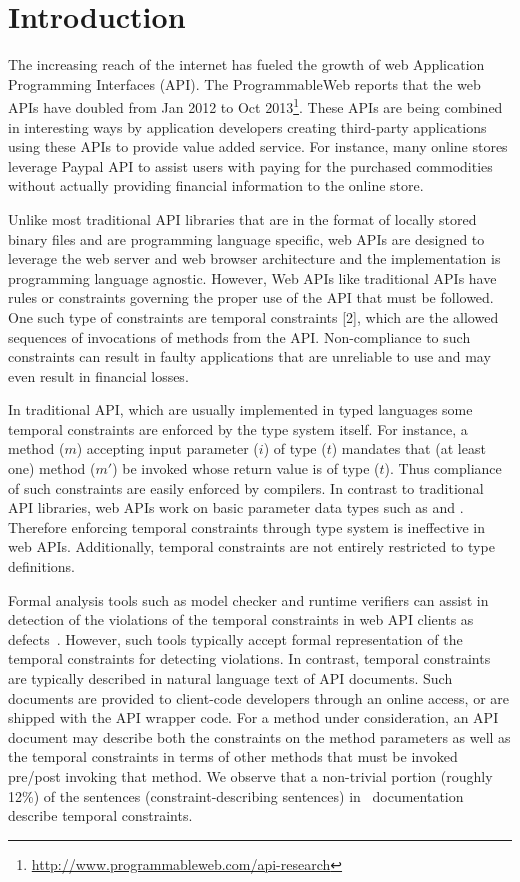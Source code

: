 \section{Introduction}
\label{sec:introduction}

The increasing reach of the internet has fueled the growth of web Application Programming Interfaces (API).
The ProgrammableWeb reports that the web APIs have doubled from Jan 2012 to Oct 2013\footnote{\url{http://www.programmableweb.com/api-research}}.
These APIs are being combined in interesting ways by application developers creating third-party applications using
these APIs to provide value added service.
For instance, many online stores leverage Paypal API to assist users with paying for the purchased commodities without actually
providing financial information to the online store.

Unlike most traditional API libraries that are in the format of locally stored binary files and are programming language specific,
web APIs are designed to leverage the web server and web browser architecture and the implementation is programming language agnostic.
However, Web APIs like traditional APIs have rules or constraints governing the proper  use of the API that must be followed.
One such type of constraints are temporal constraints [2], which are the allowed sequences of invocations of methods from the API.
Non-compliance to such constraints can result in faulty applications that are unreliable to use and may even result in financial losses.

In traditional API, which are usually implemented in typed languages some temporal constraints are enforced by the type system itself.
For instance, a method ($m$) accepting input parameter ($i$) of type ($t$) mandates
that (at least one) method ($m'$) be invoked whose return value is of type ($t$).
Thus compliance of such constraints are easily enforced by compilers.
In contrast to traditional API libraries, web APIs work on basic parameter data types such as  and .
Therefore enforcing temporal constraints through type system is ineffective in web APIs.
Additionally, temporal constraints are not entirely restricted to type definitions.

Formal analysis tools such as model checker and runtime verifiers can assist in detection of the violations of the temporal constraints in web API clients as defects~\cite{lee2012towards}.
However, such tools typically accept formal representation of the temporal constraints for detecting violations.
In contrast, temporal constraints are typically described in natural language text of API documents.
Such documents are provided to client-code developers through an online access, or are shipped with the API wrapper code.
For a method under consideration, an API document may describe both the constraints on the method parameters
as well as the temporal constraints in terms of other methods that must be invoked pre/post invoking that method.
We observe that a non-trivial portion (roughly 12\%) of the sentences (constraint-describing sentences)
in \amazonAPI\ documentation describe temporal constraints.


